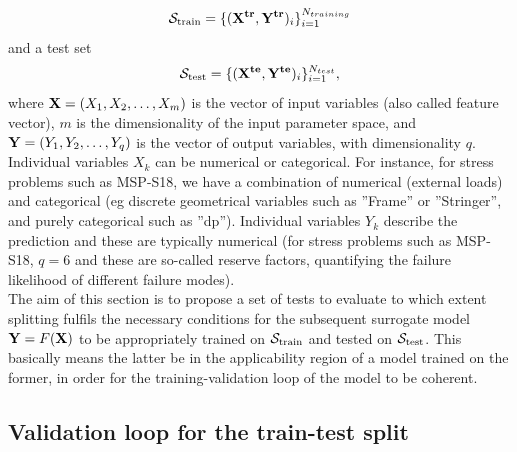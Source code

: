 $${\cal S}_{\text{train}}=\{({\bf X^{tr}},{\bf Y^{tr}})_i\}_{i=1}^{N_{training}}$$
and a test set
$${\cal S}_{\text{test}}=\{({\bf X^{te}},{\bf Y^{te}})_i\}_{i=1}^{N_{test}},$$
where ${\bf X}=(X_1,X_2,\dots,X_m)$ is the vector of input variables (also called feature vector), $m$ is the dimensionality of the input parameter space, and ${\bf Y}=(Y_1,Y_2,\dots,Y_q)$ is the vector of output variables, with dimensionality $q$. Individual variables $X_k$ can be numerical or categorical. For instance, for stress problems such as MSP-S18, we have a combination of numerical  (\eg external loads) and categorical (eg discrete geometrical variables such as ''Frame'' or ''Stringer'', and purely categorical such as ''dp''). Individual variables $Y_k$ describe the prediction and these are typically numerical (for stress problems such as MSP-S18, $q=6$ and these are so-called reserve factors, quantifying the failure likelihood of different failure modes).\\
%
\indent The aim of this section is to propose a set of tests to evaluate to which extent splitting fulfils the necessary conditions for the subsequent surrogate model ${\bf {Y}}={F}({\bf X})$ to be appropriately trained on ${\cal S}_{\text{train}}$ and tested on ${\cal S}_{\text{test}}$. This basically means the latter be in the applicability region of a model trained on the former, in order for the training-validation loop of the model to be coherent.\\
%
\subsection{Validation loop for the train-test split}
